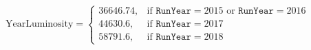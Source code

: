 
\begin{equation}
    \text{YearLuminosity} = \begin{cases}
        36646.74, & \text{if } \texttt{RunYear} = 2015 \text{ or } \texttt{RunYear} = 2016 \\
        44630.6,  & \text{if } \texttt{RunYear} = 2017                                     \\
        58791.6,  & \text{if } \texttt{RunYear} = 2018
    \end{cases}
\end{equation}


